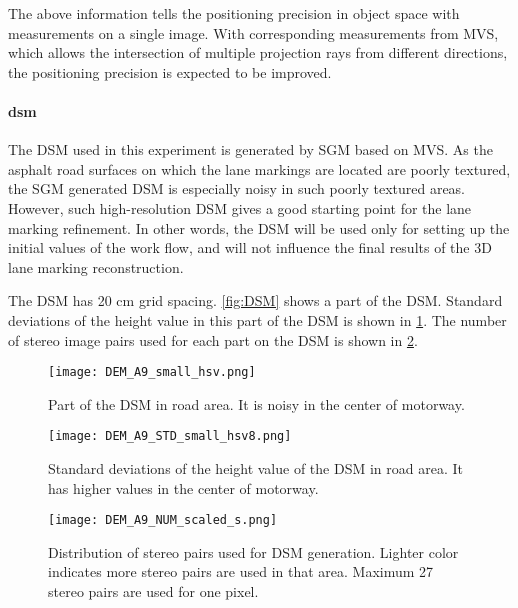The above information tells the positioning precision in object space with measurements on a single image. With corresponding measurements from MVS, which allows the intersection of multiple projection rays from different directions, the positioning precision is expected to be improved.%



\paragraph{\gls{dsm}}
The DSM used in this experiment is generated by SGM based on MVS. As the asphalt road surfaces on which the lane markings are located are poorly textured, the SGM generated DSM is especially noisy in such poorly textured areas. However, such high-resolution DSM gives a good starting point for the lane marking refinement. In other words, the DSM will be used only for setting up the initial values of the work flow, and will not influence the final results of the 3D lane marking reconstruction.

The DSM has 20 cm grid spacing. \cref{fig:DSM} shows a part of the DSM. Standard deviations of the height value in this part of the DSM is shown in \cref{fig:DSMstd}. The number of stereo image pairs used for each part on the DSM is shown in \cref{fig:DSMnumber}.

\begin{figure}%
  \centering
  \texttt{[image: DEM\_A9\_small\_hsv.png]}
  \caption{\small Part of the DSM in road area. It is noisy in the center of motorway.}
  \label{fig:DSM}
  \vspace{0.5cm}
  \texttt{[image: DEM\_A9\_STD\_small\_hsv8.png]}
  \caption{\small Standard deviations of the height value of the DSM in road area. It has higher values in the center of motorway.}
  \label{fig:DSMstd}

\end{figure}

\begin{figure}%
  \centering
  \texttt{[image: DEM\_A9\_NUM\_scaled\_s.png]}
  \caption{\small Distribution of stereo pairs used for DSM generation. Lighter color indicates more stereo pairs are used in that area. Maximum 27 stereo pairs are used for one pixel.}%
  \label{fig:DSMnumber}
\end{figure}


